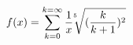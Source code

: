 \documentclass{memoir}
\begin{document}
\begin{huge}

\[ f(x) = \sum_{k=0}^{k=\infty} \frac{1}{x} \sqrt[\leftroot{5} \uproot{5} 5]{(\frac{k}{k+1})^2} \]


\end{huge}
\end{document}
